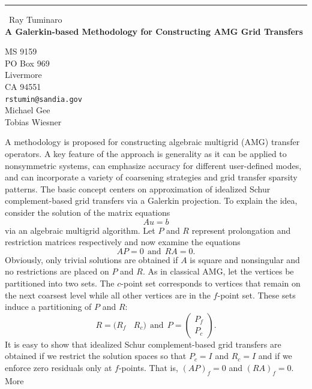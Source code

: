 \documentclass{report}
\begin{document}
\begin{center}
\rule{6in}{1pt} \
{\large Ray Tuminaro \\
{\bf A Galerkin-based Methodology for Constructing AMG Grid Transfers}}

MS 9159 \\ PO Box 969 \\ Livermore \\ CA 94551
\\
{\tt rstumin@sandia.gov}\\
Michael Gee\\
Tobias Wiesner\end{center}

A methodology is proposed for constructing algebraic multigrid (AMG)
transfer operators. A key feature of the approach is generality
as it can be applied to nonsymmetric systems,
can emphasize accuracy for different user-defined modes,
and can incorporate a variety of
coarsening strategies and grid transfer sparsity patterns.
The basic concept centers on
approximation of idealized Schur complement-based grid transfers via a Galerkin
projection. To explain the idea,
consider the solution of the matrix equations
\begin{equation} \label{matrix equation}
A u = b
\end{equation}
via an algebraic multigrid algorithm.
Let $P$ and $R$ represent prolongation and restriction matrices respectively
and now examine
the equations
\begin{equation} \label{core transfer equation}
A P = 0 ~~\mbox{and}~~ R A = 0 .
\end{equation}
Obviously, only trivial solutions are obtained if $A$ is square
and nonsingular and no restrictions are placed on $P$ and $R$.
As in classical AMG, let the vertices be partitioned into two sets.
The $c$-point set corresponds to vertices that remain on the next
coarsest level while all other vertices are in the $f$-point set.
These sets induce a partitioning of $P$ and $R$:
\begin{equation}
\label{lab:prolongatorandrestrictor}
R = \bigl(R_f~~~~R_c\bigr) ~~\mbox{and}~~
P =\begin{pmatrix}P_f\\ P_c\end{pmatrix} .
\end{equation}
It is easy to show that idealized Schur complement-based grid
transfers are obtained if we restrict the solution spaces so that
$P_c = I$ and $R_c = I$ and if we enforce zero residuals
only at $f$-points. That is, $(AP)_f = 0 $ and $(RA)_f = 0 $. More
\end{document}
